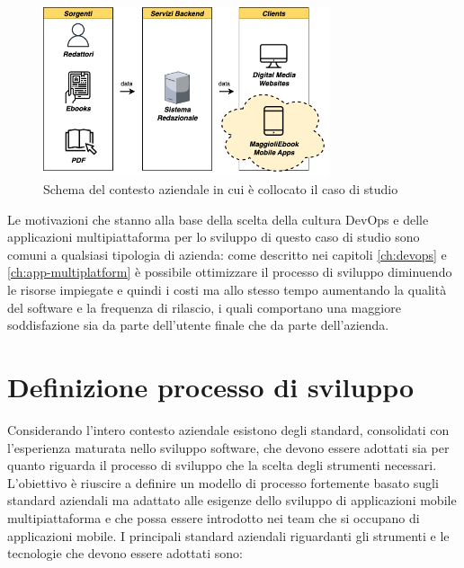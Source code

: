 \begin{figure}[H]
    \centering
    \includegraphics[width=0.75\textwidth]{img/contesto-aziendale.png}
    \caption{Schema del contesto aziendale in cui è collocato il caso di studio}
    \label{contesto-aziendale-fig}
\end{figure}

Le motivazioni che stanno alla base della scelta della cultura DevOps e delle applicazioni multipiattaforma per lo sviluppo di questo caso di studio sono comuni a qualsiasi tipologia di azienda: 
come descritto nei capitoli \ref{ch:devops} e \ref{ch:app-multiplatform} è possibile ottimizzare il processo di sviluppo diminuendo le risorse impiegate e quindi i costi ma allo stesso tempo aumentando la qualità del software e la frequenza di rilascio,
i quali comportano una maggiore soddisfazione sia da parte dell'utente finale che da parte dell'azienda.

\section{Definizione processo di sviluppo}
Considerando l'intero contesto aziendale esistono degli standard, 
consolidati con l'esperienza maturata nello sviluppo software, 
che devono essere adottati sia per quanto riguarda il processo di sviluppo che la scelta degli strumenti necessari. 
L'obiettivo è riuscire a definire un modello di processo fortemente basato sugli standard aziendali ma adattato alle esigenze dello sviluppo di applicazioni mobile multipiattaforma e che possa essere introdotto nei team che si occupano di applicazioni mobile. 
I principali standard aziendali riguardanti gli strumenti e le tecnologie che devono essere adottati sono:

